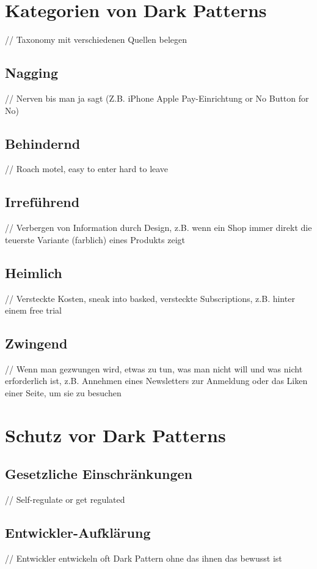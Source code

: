 \documentclass[conference,compsoc,final,a4paper]{IEEEtran}
\begin{document}
\newpage
\section{Kategorien von Dark Patterns}
// Taxonomy mit verschiedenen Quellen belegen \autocite*{Gray_2018,M.Bhoot2020,Brignull}
\subsection{Nagging}
// Nerven bis man ja sagt (Z.B. iPhone Apple Pay-Einrichtung or No Button for No)
\subsection{Behindernd}
// Roach motel, easy to enter hard to leave
\subsection{Irreführend}
// Verbergen von Information durch Design, z.B. wenn ein Shop immer direkt die teuerste Variante (farblich) eines Produkts zeigt
\subsection{Heimlich}
// Versteckte Kosten, sneak into basked, versteckte Subscriptions, z.B. hinter einem free trial
\subsection{Zwingend}
// Wenn man gezwungen wird, etwas zu tun, was man nicht will und was nicht erforderlich ist, z.B. Annehmen eines Newsletters zur Anmeldung oder das Liken einer Seite, um sie zu besuchen


\section{Schutz vor Dark Patterns}
\subsection{Gesetzliche Einschränkungen}
// Self-regulate or get regulated
\subsection{Entwickler-Aufklärung}
// Entwickler entwickeln oft Dark Pattern ohne das ihnen das bewusst ist
\end{document}
